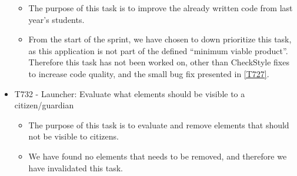 \begin{itemize}
    \begin{itemize}
  	\item The purpose of this task is to improve the already written code from
  	last year's students. 
  	\item From the start of the sprint, we have chosen to down prioritize this
  	task, as this application is not part of the defined ``minimum viable
  	product''. Therefore this task has not been worked on, other than CheckStyle
  	fixes to increase code quality, and the small bug fix presented in
  	\autoref{T727}.
  \end{itemize}
  \item T732 - Launcher: Evaluate what elements should be visible to a
citizen/guardian
  \begin{itemize}
  	\item The purpose of this task is to evaluate and remove elements that should
  	not be visible to citizens.
  	\item We have found no elements that needs to be removed, and therefore we
  	have invalidated this task.
  \end{itemize}
\end{itemize}





















